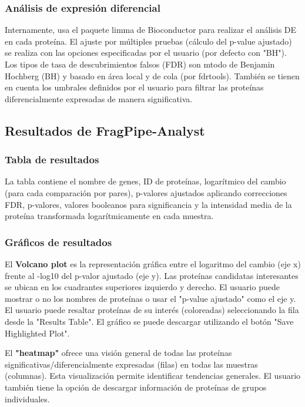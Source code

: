 \documentclass[nochap]{config/ejercicios}
\begin{document}
\subsubsection{Análisis de expresión diferencial}
Internamente, usa el paquete limma de Bioconductor para realizar el análisis DE en cada proteína. El ajuste por múltiples pruebas (cálculo del p-value ajustado) se realiza con las opciones especificadas por el usuario (por defecto con "BH"). Los tipos de tasa de descubrimientos falsos (FDR) son mtodo de Benjamin Hochberg (BH) y basado en área local y de cola (por fdrtools). También se tienen en cuenta los umbrales definidos por el usuario para filtrar las proteínas diferencialmente expresadas de manera significativa.

\subsection{Resultados de FragPipe-Analyst}
\subsubsection{Tabla de resultados}
La tabla contiene el nombre de genes, ID de proteínas, logarítmico del cambio (para cada comparación por pares), p-valores ajustados aplicando correcciones FDR, p-valores, valores booleanos para significancia y la intensidad media de la proteína transformada logarítmicamente en cada muestra.

\subsubsection{Gráficos de resultados}
El \textbf{Volcano plot} es la representación gráfica entre el logaritmo del cambio (eje x) frente al -log10 del p-valor ajustado (eje y). Las proteínas candidatas interesantes se ubican en los cuadrantes superiores izquierdo y derecho. El usuario puede mostrar o no los nombres de proteínas o usar el "p-value ajustado" como el eje y. El usuario puede resaltar proteínas de su interés (coloreadas) seleccionando la fila desde la "Results Table". El gráfico se puede descargar utilizando el botón "Save Highlighted Plot".

El \textbf{"heatmap"} ofrece una visión general de todas las proteínas significativas/diferencialmente expresadas (filas) en todas las muestras (columnas). Esta visualización permite identificar tendencias generales. El usuario también tiene la opción de descargar información de proteínas de grupos individuales.
\end{document}
